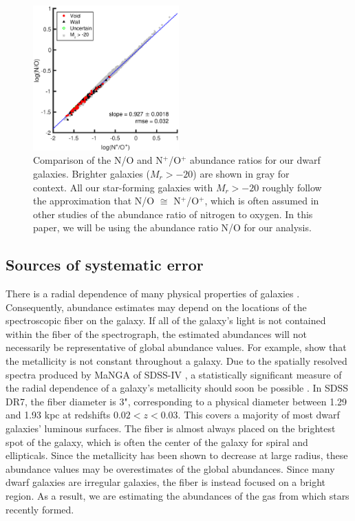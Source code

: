 \begin{figure}
    \centering
    \includegraphics[width=0.5\textwidth]{Images/Paper2/1sig_I06_dwarf_0-20_SF_t3_logNpOp_logNO_fit}
    \caption[N/O versus N$^+$/O$^+$]{Comparison of the N/O and N$^+$/O$^+$ 
    abundance ratios for our dwarf galaxies.  Brighter galaxies ($M_r > -20$) 
    are shown in gray for context.  All our star-forming galaxies with 
    $M_r > -20$ roughly follow the approximation that N/O $\cong$ N$^+$/O$^+$, 
    which is often assumed in other studies of the abundance ratio of nitrogen 
    to oxygen.  In this paper, we will be using the abundance ratio N/O for our 
    analysis.}
    \label{fig:NO_NpOp}
\end{figure}


\subsection{Sources of systematic error}

There is a radial dependence of many physical properties of galaxies 
\citep{Bell00}.  Consequently, abundance estimates may depend on the locations 
of the spectroscopic fiber on the galaxy.  If all of the galaxy's light is not 
contained within the fiber of the spectrograph, the estimated abundances will 
not necessarily be representative of global abundance values.  For example, 
\cite{Bell00} show that the metallicity is not constant throughout a galaxy.  
Due to the spatially resolved spectra produced by MaNGA of SDSS-IV 
\citep{SDSS13}, a statistically significant measure of the radial dependence of 
a galaxy's metallicity should soon be possible \citep{Wilkinson15}.  In SDSS 
DR7, the fiber diameter is 3", corresponding to a physical diameter between 1.29 
and 1.93 kpc at redshifts $0.02 < z < 0.03$.  This covers a majority of most 
dwarf galaxies' luminous surfaces.  The fiber is almost always placed on the 
brightest spot of the galaxy, which is often the center of the galaxy for spiral 
and ellipticals.  Since the metallicity has been shown to decrease at large 
radius, these abundance values may be overestimates of the global abundances.  
Since many dwarf galaxies are irregular galaxies, the fiber is instead focused 
on a bright  region.  As a result, we are estimating the abundances of 
the gas from which stars recently formed.


